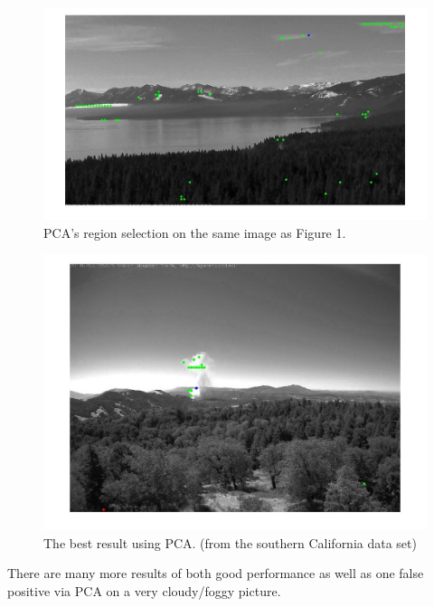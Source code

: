 \documentclass[12pt]{article}
\begin{document}
\begin{figure}[H]
\centering
\includegraphics[scale=.2]{pcaTahoeHard.jpg}
\caption{PCA's region selection on the same image as Figure 1. }
\end{figure}

\begin{figure}[H]
\centering
\includegraphics[scale=.2]{pcaGreat.jpg}
\caption{The best result using PCA. (from the southern California data set) }
\end{figure}
There are many more results of both good performance as well as one false positive via PCA on a very cloudy/foggy picture.  
\end{document}
